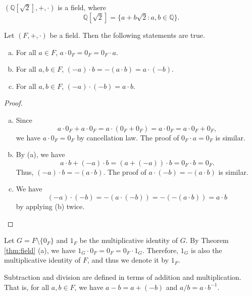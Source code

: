 \begin{example}
  $(\mathbb{Q}[\sqrt{2}], +, \cdot)$ is a field, where
  $$
  \mathbb{Q}[\sqrt{2}] = \{a + b\sqrt{2} : a, b \in \mathbb{Q}\}.
  $$
\end{example}

\begin{theorem}\label{thm:field}
  Let $(F, +, \cdot)$ be a field. Then the following statements are true.
  \begin{enumerate}[(a)]
    \item For all $a \in F$, $a \cdot 0_F = 0_F = 0_F \cdot a$.
    \item For all $a, b \in F$, $(-a) \cdot b = -(a \cdot b) = a \cdot (-b)$.
    \item For all $a, b \in F$, $(-a) \cdot (-b) = a \cdot b$.
  \end{enumerate}
\end{theorem}
\begin{proof} \leavevmode
  \begin{enumerate}[(a)]
    \item Since
      $$
      a \cdot 0_F + a \cdot 0_F
      = a \cdot (0_F + 0_F)
      = a \cdot 0_F
      = a \cdot 0_F + 0_F,
      $$
      we have $a \cdot 0_F = 0_F$ by cancellation law.
      The proof of $0_F \cdot a = 0_F$ is similar.
    \item By (a), we have
      $$
      a \cdot b + (-a) \cdot b
      = (a + (-a)) \cdot b
      = 0_F \cdot b
      = 0_F.
      $$
      Thus, $(-a) \cdot b = -(a \cdot b)$.
      The proof of $a \cdot (-b) = -(a \cdot b)$ is similar.
    \item We have
      $$
      (-a) \cdot (-b) = -(a \cdot (-b)) = -(-(a \cdot b)) = a \cdot b
      $$
      by applying (b) twice. \qedhere
  \end{enumerate}
\end{proof}

\begin{remark}
  Let $G = F \setminus \{0_F\}$ and $1_F$ be the multiplicative identity of
  $G$.
  By Theorem \ref{thm:field} (a), we have
  $1_G \cdot 0_F = 0_F = 0_F \cdot 1_G$.
  Therefore, $1_G$ is also the multiplicative identity of $F$, and thus we
  denote it by $1_F$.
\end{remark}

\begin{remark}
  Subtraction and division are defined in terms of addition and
  multiplication.
  That is, for all $a, b \in F$, we have $a - b = a + (-b)$ and
  $a / b = a \cdot b^{-1}$.
\end{remark}